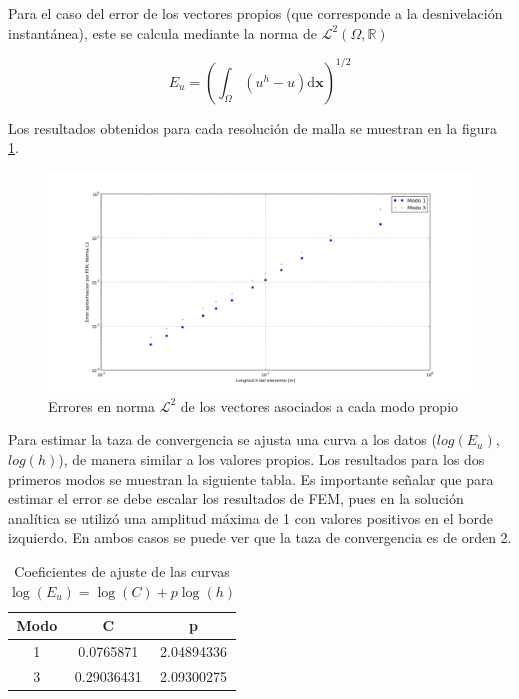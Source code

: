 Para el caso del error de los vectores propios (que corresponde a la desnivelaci\'on instant\'anea), este se calcula mediante la norma de $\mathcal{L}^2(\Omega,\mathbb{R})$

$$E_u = \left(\int_{\Omega} (u^h - u) \mathrm{d}\boldsymbol{x} \right)^{1/2}$$

Los resultados obtenidos para cada resoluci\'on de malla se muestran en la figura \ref{fig:vectores_propios}.

\begin{figure}
  \centering
  \includegraphics[width=17cm]{figuras/vectores_propiosFEM.png}
  \caption{Errores en norma $\mathcal{L}^2$ de los vectores asociados a cada modo propio}
  \label{fig:vectores_propios}
\end{figure}

Para estimar la taza de convergencia se ajusta una curva a los datos ($log(E_u)$, $log(h)$), de manera similar a los valores propios. Los resultados para los dos primeros modos se muestran la siguiente tabla. Es importante señalar que para estimar el error se debe escalar los resultados de FEM, pues en la soluci\'on anal\'itica se utiliz\'o una amplitud m\'axima de 1 con valores positivos en el borde izquierdo. En ambos casos se puede ver que la taza de convergencia es de orden 2.

\begin{table}
  \centering
  \begin{tabular}{|c|c|c|}
  \hline 
  Modo & C & p \\ 
  \hline 
  1 & 0.0765871 & 2.04894336 \\  
  \hline 
  3 & 0.29036431 & 2.09300275 \\  
  \hline 
  \end{tabular} 
  \caption{Coeficientes de ajuste de las curvas $\log(E_u)=\log(C)+p\log(h)$}
\end{table}


